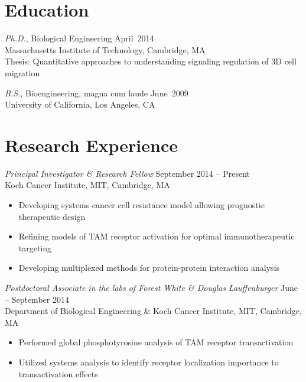 \documentclass[11pt]{res}
\begin{document}
\begin{resume}

\raggedright 

\section{Education}

{\sl Ph.D.}, 
Biological Engineering  \hfill April~2014\\ 
Massachusetts Institute of Technology, Cambridge, MA \\ 
Thesis: Quantitative approaches to understanding signaling regulation of 3D cell migration
 
{\sl B.S.}, Bioengineering, magna cum laude \hfill June~2009\\ 
University of California, Los Angeles, CA

\section{Research Experience}

{\sl Principal Investigator \& Research Fellow} \hfill September 2014 -- Present \\
Koch Cancer Institute, MIT, Cambridge, MA 
\begin{itemize} \itemsep -2pt %
\item Developing systems cancer cell resistance model allowing prognostic therapeutic design
\item Refining models of TAM receptor activation for optimal immunotherapeutic targeting
\item Developing multiplexed methods for protein-protein interaction analysis
\end{itemize}

{\sl Postdoctoral Associate in the labs of Forest White \& Douglas Lauffenburger} \hfill June -- September 2014 \\
Department of Biological Engineering \& Koch Cancer Institute, MIT, Cambridge, MA 
\begin{itemize} \itemsep -2pt %
\item Performed global phosphotyrosine analysis of TAM receptor transactivation 
\item Utilized systems analysis to identify receptor localization importance to transactivation effects
\end{itemize}
 

\end{resume}
\end{document}
